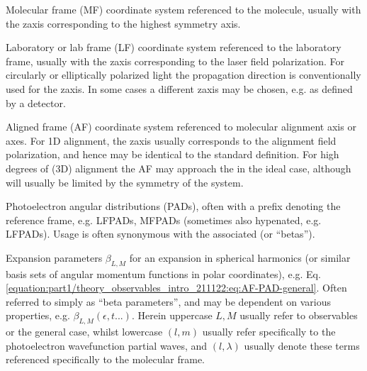 \documentclass[letterpaper,table,10pt,english]{jupyterBook}
\begin{document}
\label{\detokenize{backmatter/glossary:glossary}}\label{\detokenize{backmatter/glossary::doc}}\begin{description}
\sphinxAtStartPar
Molecular frame (MF) \sphinxhyphen{} coordinate system referenced to the molecule, usually with the z\sphinxhyphen{}axis corresponding to the highest symmetry axis.

\sphinxAtStartPar
Laboratory or lab frame (LF) \sphinxhyphen{} coordinate system referenced to the laboratory frame, usually with the z\sphinxhyphen{}axis corresponding to the laser field polarization. For circularly or elliptically polarized light the propagation direction is conventionally used for the z\sphinxhyphen{}axis. In some cases a different z\sphinxhyphen{}axis may be chosen, e.g. as defined by a detector.

\sphinxAtStartPar
Aligned frame (AF) \sphinxhyphen{} coordinate system referenced to molecular alignment axis or axes. For 1D alignment, the z\sphinxhyphen{}axis usually corresponds to the alignment field polarization, and hence may be identical to the standard {\hyperref[\detokenize{backmatter/glossary:term-LF}]{}} definition. For high degrees of (3D) alignment the AF may approach the {\hyperref[\detokenize{backmatter/glossary:term-MF}]{}} in the ideal case, although will usually be limited by the symmetry of the system.

\sphinxAtStartPar
Photoelectron angular distributions (PADs), often with a prefix denoting the reference frame, e.g. LFPADs, MFPADs (sometimes also hypenated, e.g. LF\sphinxhyphen{}PADs). Usage is often synonymous with the associated {\hyperref[\detokenize{backmatter/glossary:term-anisotropy-paramters}]{}} (or “betas”).

\sphinxAtStartPar
Expansion parameters \(\beta_{L,M}\) for an expansion in spherical harmonics (or similar basis sets of angular momentum functions in polar coordinates), e.g. Eq. \eqref{equation:part1/theory_observables_intro_211122:eq:AF-PAD-general}. Often referred to simply as “beta parameters”, and may be dependent on various properties, e.g. \(\beta_{L,M}(\epsilon,t...)\). Herein upper\sphinxhyphen{}case \(L,M\) usually refer to observables or the general case, whilst lower\sphinxhyphen{}case \((l,m)\) usually refer specifically to the photoelectron wavefunction partial waves, and \((l,\lambda)\) usually denote these terms referenced specifically to the molecular frame.


\end{description}
\end{document}
